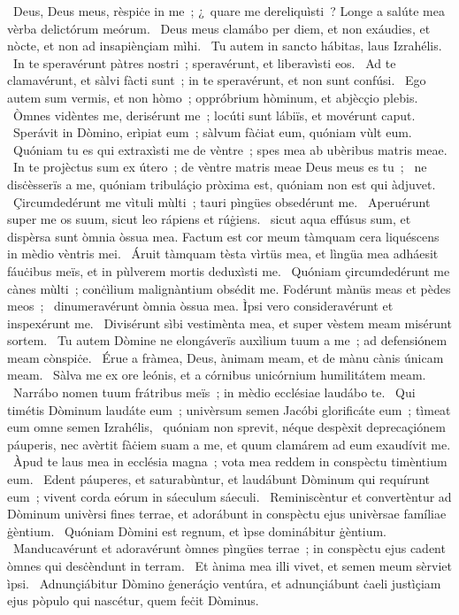 ~Deus, Deus meus, rèspiċe in me~; ¿~quare me dereliquìsti~? Longe a salúte mea vèrba delictórum meórum. 
~Deus meus clamábo per diem, et non exáudies, et nòcte, et non ad insapiènçiam mìhi. 
~Tu autem in sancto hábitas, laus Izrahélis. 
~In te speravérunt pàtres nostri~; speravérunt, et liberavìsti eos. 
~Ad te clamavérunt, et sàlvi fàcti sunt~; in te speravérunt, et non sunt confúsi. 
~Ego autem sum vermis, et non hòmo~; oppróbrium hòminum, et abjècçio plebis. 
~Òmnes vidèntes me, derisérunt me~; locúti sunt lábiïs, et movérunt caput. 
~Sperávit in Dòmino, erìpiat eum~; sàlvum fàċiat eum, quóniam vùlt eum. 
~Quóniam tu es qui extraxìsti me de vèntre~; spes mea ab ubèribus matris meae. 
~In te projèctus sum ex útero~; de vèntre matris meae Deus meus es tu~; 
~ne disċèsserïs a me, quóniam tribuláçio pròxima est, quóniam non est qui àdjuvet. 
~Çircumdedérunt me vìtuli mùlti~; tauri pìngües obsedérunt me. 
~Aperuérunt super me os suum, sicut leo rápiens et rúġiens. 
~sicut aqua effúsus sum, et dispèrsa sunt òmnia òssua mea. Factum est cor meum tàmquam cera liquéscens in mèdio vèntris mei. 
~Áruit tàmquam tèsta vìrtüs mea, et lìngüa mea adháesit fáuċibus meïs, et in pùlverem mortis deduxìsti me. 
~Quóniam çircumdedérunt me cànes mùlti~; conċìlium malignàntium obsédit me. Fodérunt mànüs meas et pèdes meos~; 
~dinumeravérunt òmnia òssua mea. Ìpsi vero consideravérunt et inspexérunt me. 
~Divisérunt sìbi vestimènta mea, et super vèstem meam misérunt sortem. 
~Tu autem Dòmine ne elongáverïs auxìlium tuum a me~; ad defensiónem meam cònspiċe. 
~Érue a fràmea, Deus, ànimam meam, et de mànu cànis únicam meam. 
~Sàlva me ex ore leónis, et a córnibus unicórnium humilitátem meam. 
~Narrábo nomen tuum frátribus meïs~; in mèdio ecclésiae laudábo te. 
~Qui timétis Dòminum laudáte eum~; univèrsum semen Jacóbi glorificáte eum~; tìmeat eum omne semen Izrahélis, 
~quóniam non sprevit, néque despèxit deprecaçiónem páuperis, nec avèrtit fàċiem suam a me, et quum clamárem ad eum exaudívit me. 
~Àpud te laus mea in ecclésia magna~; vota mea reddem in conspèctu timèntium eum. 
~Edent páuperes, et saturabùntur, et laudábunt Dòminum qui requírunt eum~; vivent corda eórum in sáeculum sáeculi. 
~Reminiscèntur et convertèntur ad Dòminum univèrsi fines terrae, et adorábunt in conspèctu ejus univèrsae famíliae ġèntium. 
~Quóniam Dòmini est regnum, et ìpse dominábitur ġèntium. 
~Manducavérunt et adoravérunt òmnes pìngües terrae~; in conspèctu ejus cadent òmnes qui desċèndunt in terram. 
~Et ànima mea illi vivet, et semen meum sèrviet ìpsi. 
~Adnunçiábitur Dòmino ġeneráçio ventúra, et adnunçiábunt ċaeli justìçiam ejus pòpulo qui nascétur, quem feċit Dòminus. 
